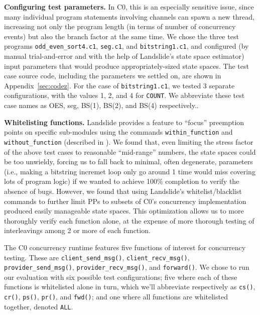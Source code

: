 \documentclass{article}
\begin{document}
{\bf Configuring test parameters.}
In C0, this is an especially sensitive issue, since many individual program statements involving channels can spawn a new thread, increasing not only the program length (in terms of number of concurrency events) but also the branch factor at the same time.
We chose the three test programs {\tt odd\_even\_sort4.c1}, {\tt seg.c1}, and {\tt bitstring1.c1}, and configured (by manual trial-and-error and with the help of Landslide's state space estimator) input parameters that would produce appropriately-sized state spaces.
The test case source code, including the parameters we settled on, are shown in Appendix~\ref{sec:codez}. For the case of {\tt bitstring1.c1}, we tested 3 separate configurations, with the values 1, 2, and 4 for {\tt COUNT}.
We abbreviate these test case names as OES, seg, BS(1), BS(2), and BS(4) respectively..

\newcommand\clis{\texttt{cs()}}
\newcommand\clir{\texttt{cr()}}
\newcommand\pros{\texttt{ps()}}
\newcommand\pror{\texttt{pr()}}
\newcommand\fwd{\texttt{fwd()}}
\newcommand\all{\texttt{ALL}}
{\bf Whitelisting functions.}
Landslide provides a feature to ``focus'' preemption points on specific sub-modules using the commands {\tt within\_function} and {\tt without\_function} (described in \cite{landslide}).
We found that, even limiting the stress factor of the above test cases to reasonable ``mid-range'' numbers, the state spaces could be too unwieldy, forcing us to fall back to minimal, often degenerate, parameters (i.e., making a bitstring incremet loop only go around 1 time would miss covering lots of program logic) if we wanted to achieve 100\% completion to verify the absence of bugs.
However, we found that using Landslide's whitelist/blacklist commands to further limit PPs to subsets of C0's concurrency implementation produced easily manageable state spaces.
This optimization allows us to more thoroughly verify each function alone, at the expense of more thorough testing of interleavings among 2 or more of each function.

The C0 concurrency runtime features five functions of interest for concurrency testing. These are
\texttt{client\_send\_msg()},
\texttt{client\_recv\_msg()},
\texttt{provider\_send\_msg()},
\texttt{provider\_recv\_msg()},
and
\texttt{forward()}.
We chose to run our evaluation with six possible test configurations; five where each of these functions is whitelisted alone in turn, which we'll abbreviate respectively as \clis, \clir, \pros, \pror, and \fwd; and one where all functions are whitelisted together, denoted \all.
\end{document}
